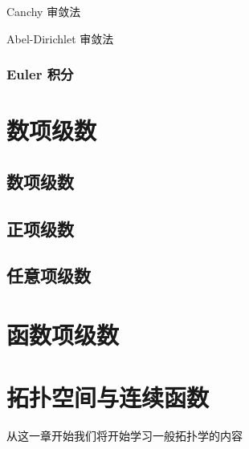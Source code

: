 \documentclass[cn,toc=twocol]{elegantbook}
\begin{document}
\begin{theorem}{Canchy 审敛法}
	
\end{theorem}



\begin{theorem}{Abel-Dirichlet 审敛法}
	
\end{theorem}



\subsection{Euler 积分}



\chapter{数项级数}

\section{数项级数}

\section{正项级数}

\section{任意项级数}



\chapter{函数项级数}


\chapter{拓扑空间与连续函数}
从这一章开始我们将开始学习一般拓扑学的内容
\end{document}
